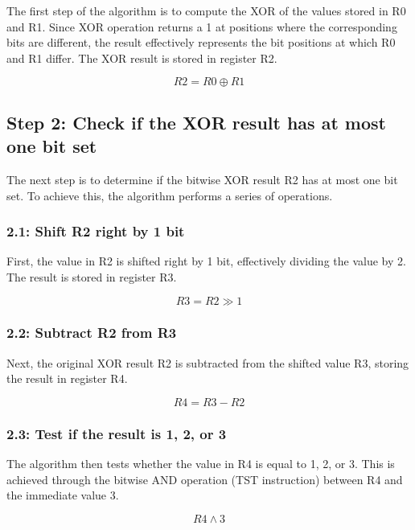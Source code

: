 The first step of the algorithm is to compute the XOR of the values stored in R0 and R1. Since XOR operation returns a 1 at positions where the corresponding bits are different, the result effectively represents the bit positions at which R0 and R1 differ. The XOR result is stored in register R2.

\begin{equation}
R2 = R0 \oplus R1
\end{equation}

\subsection{Step 2: Check if the XOR result has at most one bit set}

The next step is to determine if the bitwise XOR result R2 has at most one bit set. To achieve this, the algorithm performs a series of operations.

\subsubsection{2.1: Shift R2 right by 1 bit}

First, the value in R2 is shifted right by 1 bit, effectively dividing the value by 2. The result is stored in register R3.

\begin{equation}
R3 = R2 \gg 1
\end{equation}

\subsubsection{2.2: Subtract R2 from R3}

Next, the original XOR result R2 is subtracted from the shifted value R3, storing the result in register R4.

\begin{equation}
R4 = R3 - R2
\end{equation}

\subsubsection{2.3: Test if the result is 1, 2, or 3}

The algorithm then tests whether the value in R4 is equal to 1, 2, or 3. This is achieved through the bitwise AND operation (TST instruction) between R4 and the immediate value 3.

\begin{equation}
R4 \wedge 3
\end{equation}

